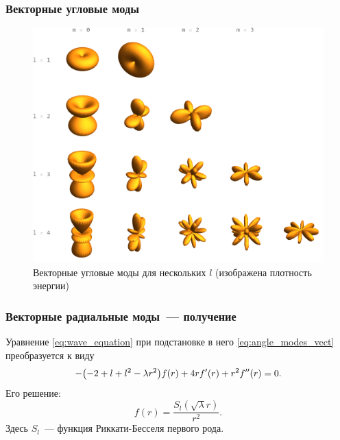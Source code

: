 \documentclass[compress]{beamer}
\begin{document}

    \begin{frame}\frametitle{Векторные угловые моды}

        \begin{figure}[h]
            \centering
            \includegraphics[width=\textwidth,height=0.6\textheight,keepaspectratio]{angle_modes_vect_ii}
            \caption[]{Векторные угловые моды для нескольких $l$ (изображена плотность энергии)}
            \label{fig:angle_modes_vect_ii}
        \end{figure}

    \end{frame}


    \begin{frame}\frametitle{Векторные радиальные моды~--- получение}

        Уравнение \autoref{eq:wave_equation} при подстановке в него \autoref{eq:angle_modes_vect} преобразуется к виду
        \begin{equation*}
            - \qty(-2 + l + l^2 - \lambda r^2) f(r) +
            4 r f'(r) + r^2 f''(r) = 0 .
        \end{equation*}
        Его решение:
        \begin{equation*}
            f(r) = \frac{S_l(\sqrt\lambda r)}{r^2} .
        \end{equation*}
        Здесь $S_l$~--- функция Риккати-Бесселя первого рода.

    \end{frame}
\end{document}
